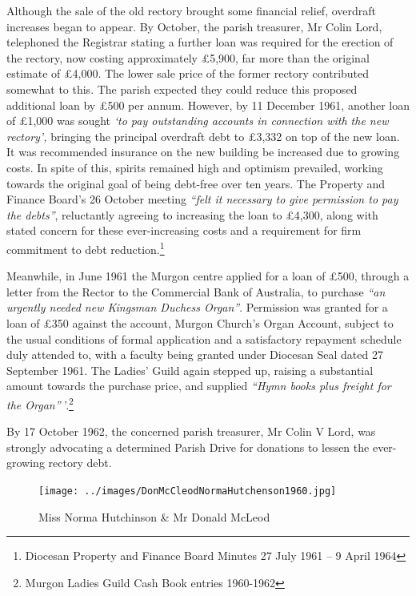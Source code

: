 Although the sale of the old rectory brought some financial relief, overdraft increases began to appear. By October, the parish treasurer, Mr Colin Lord, telephoned the Registrar stating a further loan was required for the erection of the rectory, now costing approximately \pounds5,900, far more than the original estimate of \pounds4,000. The lower sale price of the former rectory contributed somewhat to this. The parish expected they could reduce this proposed additional loan by \pounds500 per annum. However, by 11 December 1961, another loan of \pounds1,000 was sought \emph{`to pay outstanding accounts in connection with the new rectory',} bringing the principal overdraft debt to \pounds3,332 on top of the new loan. It was recommended insurance on the new building be increased due to growing costs. In spite of this, spirits remained high and optimism prevailed, working towards the original goal of being debt-free over ten years. The Property and Finance Board's 26 October meeting \emph{``felt it necessary to give permission to pay the debts''}, reluctantly agreeing to increasing the loan to \pounds4,300, along with stated concern for these ever-increasing costs and a requirement for firm commitment to debt reduction.\footnote{Diocesan Property and Finance Board Minutes 27 July 1961 -- 9 April 1964}


Meanwhile, in June 1961 the Murgon centre applied for a loan of \pounds500, through a letter from the Rector to the Commercial Bank of Australia, to purchase \emph{``an urgently needed new Kingsman Duchess Organ''}. Permission was granted for a loan of \pounds350 against the account, Murgon Church's Organ Account, subject to the usual conditions of formal application and a satisfactory repayment schedule duly attended to, with a faculty being granted under Diocesan Seal dated 27 September 1961. The Ladies' Guild again stepped up, raising a substantial amount towards the purchase price, and supplied \emph{``Hymn books plus freight for the Organ''\,'}.\footnote{Murgon Ladies Guild Cash Book entries 1960-1962}


By 17 October 1962, the concerned parish treasurer, Mr Colin V Lord, was strongly advocating a determined Parish Drive for donations to lessen the ever-growing rectory debt.









\begin{figure}[!htb]
\begin{center}
\texttt{[image: ../images/DonMcCleodNormaHutchenson1960.jpg]}
\caption{Miss Norma Hutchinson \& Mr Donald McLeod}
\end{center}
\end{figure}




